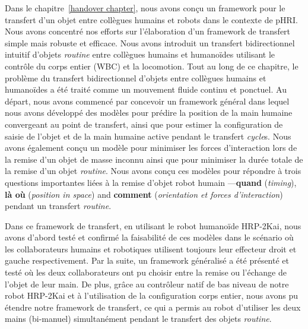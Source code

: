 Dans le chapitre~\ref{handover chapter}, nous avons conçu un framework pour le transfert d'un objet entre collègues humains et robots dans le contexte de pHRI. Nous avons concentré nos efforts sur l'élaboration d'un framework de transfert simple mais robuste et efficace. Nous avons introduit un transfert bidirectionnel intuitif d'objets \textit{routine} entre collègues humains et humanoïdes utilisant le contrôle du corps entier (WBC) et la locomotion. Tout au long de ce chapitre, le problème du transfert bidirectionnel d'objets entre collègues humains et humanoïdes a été traité comme un mouvement fluide continu et ponctuel. Au départ, nous avons commencé par concevoir un framework général dans lequel nous avons développé des modèles pour prédire la position de la main humaine convergeant au point de transfert, ainsi que pour estimer la configuration de saisie de l'objet et de la main humaine active pendant le transfert \textit{cycle}s. Nous avons également conçu un modèle pour minimiser les forces d'interaction lors de la remise d'un objet de masse inconnu ainsi que pour minimiser la durée totale de la remise d'un objet \textit{routine}. Nous avons conçu ces modèles pour répondre à trois questions importantes liées à la remise d'objet robot humain ---\textbf{quand} (\textit{timing}), \textbf{là où} (\textit{position in space}) and \textbf{comment} (\textit{orientation et forces d'interaction}) pendant un transfert \textit{routine}.




Dans ce framework de transfert, en utilisant le robot humanoïde HRP-2Kai, nous avons d'abord testé et confirmé la faisabilité de ces modèles dans le scénario où les collaborateurs humains et robotiques utilisent toujours leur effecteur droit et gauche respectivement. Par la suite, un framework généralisé a été présenté et testé où les deux collaborateurs ont pu choisir entre la remise ou l'échange de l'objet de leur main. De plus, grâce au contrôleur natif de bas niveau de notre robot HRP-2Kai et à l'utilisation de la configuration corps entier, nous avons pu étendre notre framework de transfert, ce qui a permis au robot d'utiliser les deux mains (bi-manuel) simultanément pendant le transfert des objets \textit{routine}.


